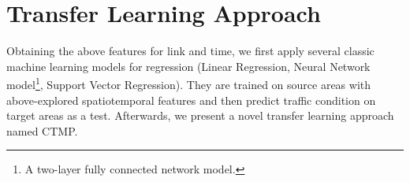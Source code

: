 \section{Transfer Learning Approach}
Obtaining the above features for link and time,
we first apply several classic machine learning models for regression (Linear Regression, Neural Network model\footnote{A two-layer fully connected network model.}, Support Vector Regression).
They are trained on source areas with above-explored spatiotemporal features and then predict traffic condition on target areas as a test.
Afterwards, we present a novel transfer learning approach named CTMP.

%
%
%
%
%

